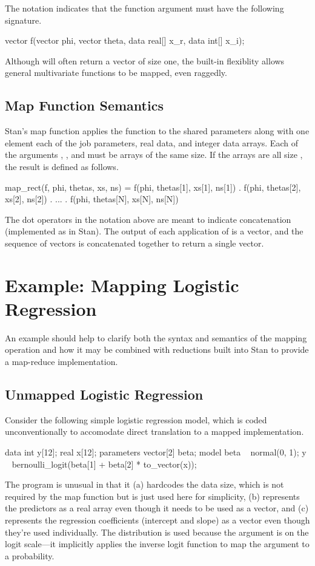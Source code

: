 The notation  indicates
that the function argument  must have the following signature.
%
\begin{stancode}
vector f(vector phi, vector theta,
         data real[] x_r, data int[] x_i);
\end{stancode}
%
Although  will often return a vector of size one, the built-in
flexiblity allows general multivariate functions to be mapped, even
raggedly.

\subsection{Map Function Semantics}

Stan's map function applies the function  to the shared
parameters along with one element each of the job parameters, real
data, and integer data arrays.  Each of the arguments ,
, and  must be arrays of the same size.  If the
arrays are all size , the result is defined as follows.
%
\begin{stancode}
map_rect(f, phi, thetas, xs, ns)
= f(phi, thetas[1], xs[1], ns[1]) . f(phi, thetas[2], xs[2], ns[2])
  . ... . f(phi, thetas[N], xs[N], ns[N])
\end{stancode}
%
The dot operators in the notation above are meant to indicate
concatenation (implemented as  in Stan).  The output
of each application of  is a vector, and the sequence of
 vectors is concatenated together to return a single vector.


\section{Example:  Mapping Logistic Regression}

An example should help to clarify both the syntax and semantics of the
mapping operation and how it may be combined with reductions built
into Stan to provide a map-reduce implementation.

\subsection{Unmapped Logistic Regression}

Consider the following simple logistic regression model, which is
coded unconventionally to accomodate direct translation to a mapped
implementation.
%
\begin{stancode}
data {
  int y[12];
  real x[12];
}
parameters {
  vector[2] beta;
}
model {
  beta ~ normal(0, 1);
  y ~ bernoulli_logit(beta[1] + beta[2] * to_vector(x));
}
\end{stancode}
%
The program is unusual in that it (a) hardcodes the data size, which
is not required by the map function but is just used here for
simplicity, (b) represents the predictors as a real array even though
it needs to be used as a vector, and (c) represents the regression
coefficients (intercept and slope) as a vector even though they're
used individually.  The  distribution is used
because the argument is on the logit scale---it implicitly applies the
inverse logit function to map the argument to a probability.


